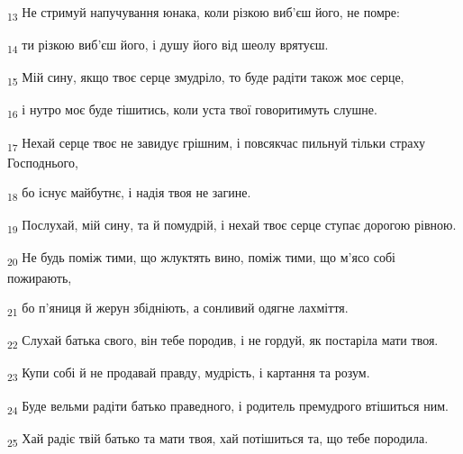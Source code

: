 \begin{tcolorbox}
\textsubscript{13} Не стримуй напучування юнака, коли різкою виб'єш його, не помре:
\end{tcolorbox}
\begin{tcolorbox}
\textsubscript{14} ти різкою виб'єш його, і душу його від шеолу врятуєш.
\end{tcolorbox}
\begin{tcolorbox}
\textsubscript{15} Мій сину, якщо твоє серце змудріло, то буде радіти також моє серце,
\end{tcolorbox}
\begin{tcolorbox}
\textsubscript{16} і нутро моє буде тішитись, коли уста твої говоритимуть слушне.
\end{tcolorbox}
\begin{tcolorbox}
\textsubscript{17} Нехай серце твоє не завидує грішним, і повсякчас пильнуй тільки страху Господнього,
\end{tcolorbox}
\begin{tcolorbox}
\textsubscript{18} бо існує майбутнє, і надія твоя не загине.
\end{tcolorbox}
\begin{tcolorbox}
\textsubscript{19} Послухай, мій сину, та й помудрій, і нехай твоє серце ступає дорогою рівною.
\end{tcolorbox}
\begin{tcolorbox}
\textsubscript{20} Не будь поміж тими, що жлуктять вино, поміж тими, що м'ясо собі пожирають,
\end{tcolorbox}
\begin{tcolorbox}
\textsubscript{21} бо п'яниця й жерун збідніють, а сонливий одягне лахміття.
\end{tcolorbox}
\begin{tcolorbox}
\textsubscript{22} Слухай батька свого, він тебе породив, і не гордуй, як постаріла мати твоя.
\end{tcolorbox}
\begin{tcolorbox}
\textsubscript{23} Купи собі й не продавай правду, мудрість, і картання та розум.
\end{tcolorbox}
\begin{tcolorbox}
\textsubscript{24} Буде вельми радіти батько праведного, і родитель премудрого втішиться ним.
\end{tcolorbox}
\begin{tcolorbox}
\textsubscript{25} Хай радіє твій батько та мати твоя, хай потішиться та, що тебе породила.
\end{tcolorbox}
